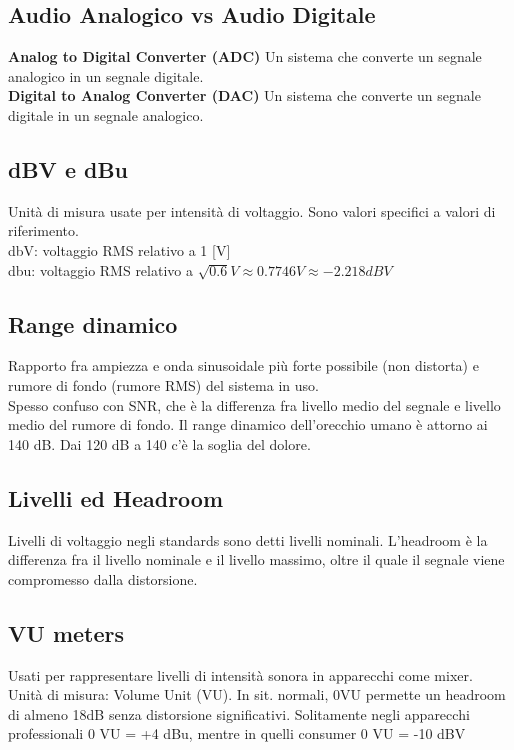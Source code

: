 \documentclass[8pt,a4paper]{article}
\begin{document}
\begin{multicols}{5}
    \section{Audio Analogico vs Audio Digitale}
    \textbf{Analog to Digital Converter (ADC)} Un sistema che converte un segnale 
    analogico in un segnale digitale. \\
    \textbf{Digital to Analog Converter (DAC)} Un sistema che converte un segnale 
    digitale in un segnale analogico.

    \subsection{dBV e dBu}
    Unità di misura usate per intensità di voltaggio.
    Sono valori specifici a valori di riferimento. \\
    dbV: voltaggio RMS relativo a 1 [V]\\
    dbu: voltaggio RMS relativo a $\sqrt{0.6} V \approx 0.7746 V \approx -2.218 dBV$

    \subsection{Range dinamico}
    Rapporto fra ampiezza e onda sinusoidale più forte possibile (non distorta)
    e rumore di fondo (rumore RMS) del sistema in uso. \\
    Spesso confuso con SNR, che è la differenza fra livello medio del segnale
    e livello medio del rumore di fondo. Il range dinamico dell'orecchio umano
    è attorno ai 140 dB. Dai 120 dB a 140 c'è la soglia del dolore.

    \subsection{Livelli ed Headroom}
    Livelli di voltaggio negli standards sono detti livelli nominali.
    L'headroom è la differenza fra il livello nominale e il livello massimo,
    oltre il quale il segnale viene compromesso dalla distorsione.

    \subsection{VU meters}
    Usati per rappresentare livelli di intensità sonora in apparecchi come mixer.
    Unità di misura: Volume Unit (VU). In sit. normali, 0VU permette un headroom
    di almeno 18dB senza distorsione significativi. Solitamente negli apparecchi
    professionali 0 VU = +4 dBu, mentre in quelli consumer 0 VU = -10 dBV


\end{multicols}
\end{document}

